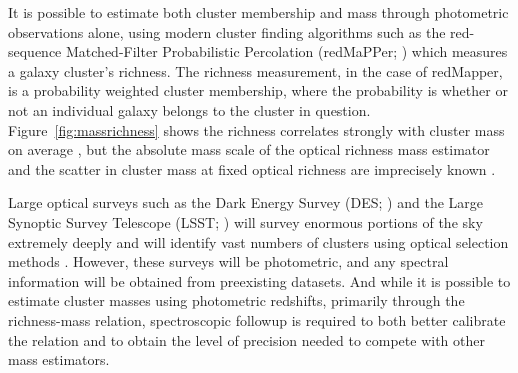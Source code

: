 It is possible to estimate both cluster membership and mass through photometric observations alone, using modern cluster finding algorithms such as the red-sequence Matched-Filter Probabilistic Percolation (redMaPPer; \citealt{Rykoff2014}) which measures a galaxy cluster's richness. The richness measurement, in the case of redMapper, is a probability weighted cluster membership, where the probability is whether or not an individual galaxy belongs to the cluster in question. Figure~\ref{fig:massrichness} shows the richness correlates strongly with cluster mass on average , but the absolute mass scale of the optical richness mass estimator and the scatter in cluster mass at fixed optical richness are imprecisely known \citep{Rykoff2012}.

Large optical surveys such as the Dark Energy Survey (DES; \citealt{DES2005}) and the Large Synoptic Survey Telescope (LSST; \citealt{LSST2012}) will survey enormous portions of the sky extremely deeply and will identify vast numbers of clusters using optical selection methods . However, these surveys will be photometric, and any spectral information will be obtained from preexisting datasets. And while it is possible to estimate cluster masses using photometric redshifts, primarily through the richness-mass relation, spectroscopic followup is required to both better calibrate the relation and to obtain the level of precision needed to compete with other mass estimators. 

